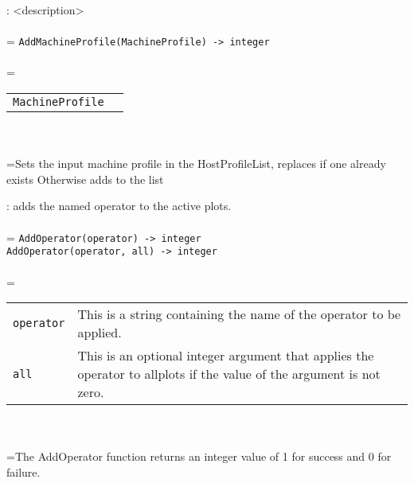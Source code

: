 \documentclass[10pt,a4paper]{report}
\begin{document}
{}
: <description>\\[-3mm]

 \\ 
\hangindent=\parindent 
\verb!AddMachineProfile(MachineProfile) -> integer!\\ [-3mm]

 \\ 
\hangindent=\parindent 
\begin{tabular}{ll}
\verb!MachineProfile! &  \\
\end{tabular} \\[-2mm]


 \\ 
\hangindent=\parindent Sets the input machine profile in the HostProfileList, replaces if one already exists Otherwise adds to the list \\[-3mm] 

\newpage


{}
: adds the named operator to the active plots.\\[-3mm]

 \\ 
\hangindent=\parindent 
\verb!AddOperator(operator) -> integer!\\ 
\verb!AddOperator(operator, all) -> integer!\\ [-3mm]

 \\ 
\hangindent=\parindent 
\begin{tabular}{lp{9cm}}
\verb!operator! & This is a string containing the name of the operator to be applied. \\
\verb!all! & This is an optional integer argument that applies the operator to allplots if the value of the argument is not zero. \\
\end{tabular} \\[-2mm]


 \\ 
\hangindent=\parindent The AddOperator function returns an integer value of 1 for success and 0 for failure. \\[-3mm] 
\end{document}
